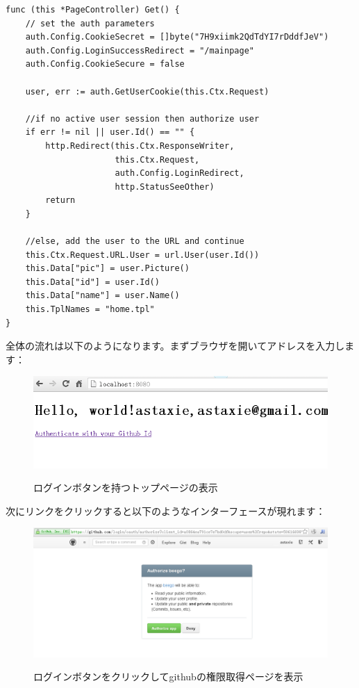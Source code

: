 \begin{enumerate}
\begin{lstlisting}[numbers=none]
func (this *PageController) Get() {
    // set the auth parameters
    auth.Config.CookieSecret = []byte("7H9xiimk2QdTdYI7rDddfJeV")
    auth.Config.LoginSuccessRedirect = "/mainpage"
    auth.Config.CookieSecure = false

    user, err := auth.GetUserCookie(this.Ctx.Request)

    //if no active user session then authorize user
    if err != nil || user.Id() == "" {
        http.Redirect(this.Ctx.ResponseWriter,
                      this.Ctx.Request,
                      auth.Config.LoginRedirect,
                      http.StatusSeeOther)
        return
    }

    //else, add the user to the URL and continue
    this.Ctx.Request.URL.User = url.User(user.Id())
    this.Data["pic"] = user.Picture()
    this.Data["id"] = user.Id()
    this.Data["name"] = user.Name()
    this.TplNames = "home.tpl"
}
\end{lstlisting}
\end{enumerate}

全体の流れは以下のようになります。まずブラウザを開いてアドレスを入力します：

\begin{figure}[H]
   \includegraphics[width=14cm]{14.4.github.png}
   \label{図14.4}
   \caption{ログインボタンを持つトップページの表示}
\end{figure}

次にリンクをクリックすると以下のようなインターフェースが現れます：

\begin{figure}[H]
   \includegraphics[width=14cm]{14.4.github2.png}
   \label{図14.5}
   \caption{ログインボタンをクリックしてgithubの権限取得ページを表示}
\end{figure}

